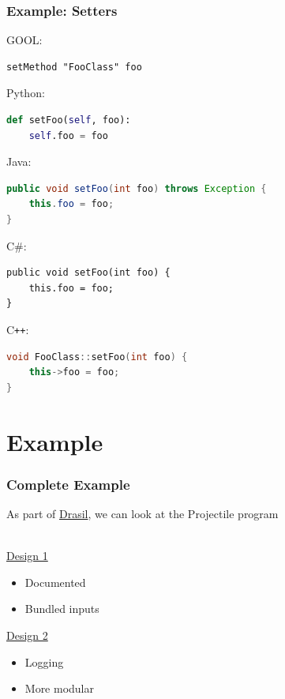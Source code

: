 \documentclass{beamer}
\newcommand{\Csharp}{C\#}
\newcommand{\Cplusplus}{C\texttt{++}}
\begin{document}
\begin{frame}[fragile]

\frametitle{Example: Setters}

GOOL:
\begin{lstlisting}
setMethod "FooClass" foo
\end{lstlisting}
\vspace{\baselineskip}

\begin{overprint}
Python:
\begin{lstlisting}[language=Python]
def setFoo(self, foo):
    self.foo = foo
\end{lstlisting}

Java:
\begin{lstlisting}[language=java]
public void setFoo(int foo) throws Exception {
    this.foo = foo;
}
\end{lstlisting}

\Csharp:
\lstset{language=[Sharp]C}
\begin{lstlisting}
public void setFoo(int foo) {
    this.foo = foo;
}
\end{lstlisting}
\lstset{language=haskell}

\Cplusplus:
\begin{lstlisting}[language=C++]
void FooClass::setFoo(int foo) {
    this->foo = foo;
}
\end{lstlisting}
\end{overprint}

\end{frame}


\section[Example]{Example}



\begin{frame}

\frametitle{Complete Example}

As part of
\href{https://jacquescarette.github.io/Drasil/}{Drasil}, we can look at the
Projectile program\\~\

\href{https://github.com/JacquesCarette/Drasil/tree/projectileDemos/Presentations/PEPM2020/projectile1}{Design
 1}
\begin{itemize}
  \item Documented
  \item Bundled inputs
\end{itemize}

\href{https://github.com/JacquesCarette/Drasil/tree/projectileDemos/Presentations/PEPM2020/projectile2}{Design
 2}
\begin{itemize}
  \item Logging
  \item More modular
\end{itemize}

\end{frame}
\end{document}
